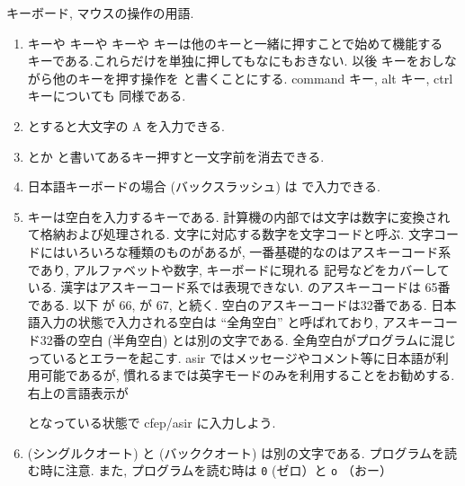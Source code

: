 \documentclass{jbook}
\begin{document}
\noindent
キーボード, マウスの操作の用語.
\begin{enumerate}
%
\item
  キーや
  キーや  キーや
  キーは他のキーと一緒に押すことで始めて機能する
 キーである.これらだけを単独に押してもなにもおきない.
 以後  キーをおしながら他のキーを押す操作を
  と書くことにする. command キー, alt キー,  ctrl キーについても 
 同様である.
%
\item
  とすると大文字の A を入力できる.
%
\item
  とか  と書いてあるキー押すと一文字前を消去できる.
%
\item 日本語キーボードの場合 \fbox{{\tt $\backslash$}}
(バックスラッシュ) は \alt{\yen} で入力できる.
%
\item
  キーは空白を入力するキーである.
  計算機の内部では文字は数字に変換されて格納および処理される.
  文字に対応する数字を文字コードと呼ぶ. 文字コードにはいろいろな種類のものがあるが,
  一番基礎的なのはアスキーコード系であり, アルファベットや数字, キーボードに現れる
  記号などをカバーしている. 漢字はアスキーコード系では表現できない.
   のアスキーコードは 65番である. 以下  が 66,  が 67,
  と続く. 
  空白のアスキーコードは32番である.
 日本語入力の状態で入力される空白は ``全角空白'' と呼ばれており,
 アスキーコード32番の空白 (半角空白) とは別の文字である.
 全角空白がプログラムに混じっているとエラーを起こす.
 asir ではメッセージやコメント等に日本語が利用可能であるが, 
 慣れるまでは英字モードのみを利用することをお勧めする.
 右上の言語表示が 
\begin{center}
\end{center}
 となっている状態で cfep/asir に入力しよう.
% 
\item
  (シングルクオート) と   (バッククオート)
は別の文字である.
 プログラムを読む時に注意.
 また, プログラムを読む時は {\tt 0} (ゼロ）と {\tt o} （おー）

\end{enumerate}
\end{document}
